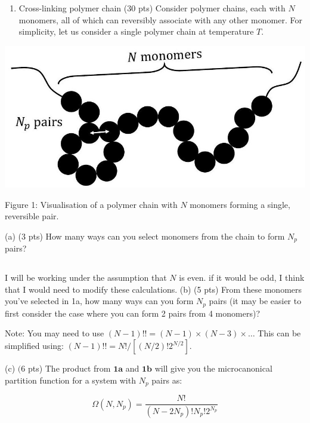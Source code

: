 \documentclass[10pt]{article}
\begin{document}
\section{}
\begin{enumerate}
  \item Cross-linking polymer chain (30 pts) Consider polymer chains, each with $N$ monomers, all of which can reversibly associate with any other monomer. For simplicity, let us consider a single polymer chain at temperature $T$.
\end{enumerate}

\begin{center}
\includegraphics[max width=\textwidth]{2024_02_03_75704bce2caff28cbfb1g-2}
\end{center}

Figure 1: Visualisation of a polymer chain with $N$ monomers forming a single, reversible pair.

(a) (3 pts) How many ways can you select monomers from the chain to form $N_{p}$ pairs?
\subsection{}
I will be working under the assumption that $N$ is even. if it would be odd, I think that I would need to modify these calculations. 
(b) (5 pts) From these monomers you've selected in 1a, how many ways can you form $N_{p}$ pairs (it may be easier to first consider the case where you can form 2 pairs from 4 monomers)?

Note: You may need to use $(N-1) ! !=(N-1) \times(N-3) \times \ldots$ This can be simplified using: $(N-1) ! !=N ! /\left[(N / 2) ! 2^{N / 2}\right]$.

(c) $(6$ pts) The product from $\mathbf{1 a}$ and $\mathbf{1} \mathbf{b}$ will give you the microcanonical partition function for a system with $N_{p}$ pairs as:

$$
\Omega\left(N, N_{p}\right)=\frac{N !}{\left(N-2 N_{p}\right) ! N_{p} ! 2^{N_{p}}}
$$
\end{document}

